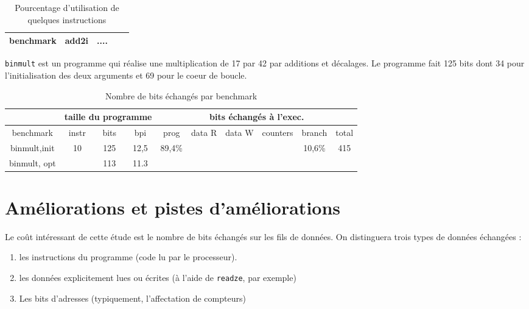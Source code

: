 \documentclass[architecture]{compas2018}
\begin{document}
\begin{table}
  \centering
  \begin{tabular}{|c||c|c|c|c|}
    \hline
    benchmark & add2i & .... &  \\
    \hline
    \hline
  \end{tabular}
  \caption{Pourcentage d'utilisation de quelques instructions}
  \label{tab:opcounts}
\end{table}

\texttt{binmult} est un programme qui réalise une multiplication de 17 par 42 par additions et décalages.
Le programme fait 125 bits dont 34 pour l'initialisation des deux arguments et 69 pour le coeur de boucle.


\iffalse
./emu/emu -i prog/mult.bin | ./huffmann.py > mult.huff

# pour le .obj ou compter les bits
./asm.py --loadhuffman mult.huff --stdout  prog/mult.s > mult.obj.huff
# Puis éditer à la main pour compter les bits, argh.

#pour le .bin
./asm.py --loadhuffman mult.huff -o prog/mult.huff.bin prog/mult.s 
./emu/emu -lh mult.huff -i prog/mult.huff.bin

\fi

\begin{table}
  \centering
  \begin{tabular}{|c||c|c|c||c|c|c|c|c||c|}
    \hline
    & \multicolumn{3}{c||}{taille du programme} & \multicolumn{6}{c|}{bits échangés à l'exec.}                    \\
    \hline

    
    benchmark    & instr & bits & bpi  & prog   & data R & data W & counters & branch & total \\
    \hline
    \hline
    binmult,init & 10    & 125  & 12,5 & 89,4\% &        &        &          & 10,6\% & 415   \\
    binmult, opt &       & 113  & 11.3 &        &        &        &          &                \\
        \hline
    \hline
  \end{tabular}
  \caption{Nombre de bits échangés par benchmark}
  \label{tab:bitcounts}
\end{table}

\section{Améliorations et pistes d'améliorations \label{sec:amelioration}}

Le coût intéressant de cette étude est le nombre de bits échangés sur les fils de données. On distinguera trois types de données échangées : 
\begin{enumerate}
\item les instructions du programme (code lu par le processeur).
\item les données explicitement lues ou écrites (à l'aide de \texttt{readze}, par exemple)
\item Les bits d'adresses (typiquement, l'affectation de compteurs)
\end{enumerate}
\end{document}
